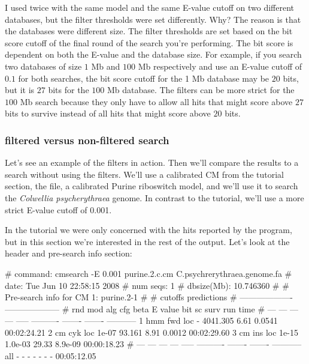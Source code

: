 \begin{srefaq}{I used  twice with the same model and
    the same E-value cutoff on two different databases, but the filter
    thresholds were set differently. Why?} The reason is that the
    databases were different size. The filter thresholds are set based
    on the bit score cutoff of the final round of the search you're
    performing. The bit score is dependent on both the E-value and the
    database size. For example, if you search two databases of size $1$
    Mb and $100$ Mb respectively and use an E-value cutoff of $0.1$ for both
    searches, the bit score cutoff for the 1 Mb database may be $20$
    bits, but it is $27$ bits for the $100$ Mb database. The filters
    can be more strict for the $100$ Mb search because they only have
    to allow all hits that might score above $27$ bits to
    survive instead of all hits that might score above $20$ bits. 
\end{srefaq}

\subsubsection{filtered versus non-filtered search}

Let's see an example of the filters in action. Then we'll compare the
results to a search without using the filters. We'll use a calibrated
CM from the tutorial section, the  file, a
calibrated Purine riboswitch model, and we'll use it to search the
\emph{Colwellia psycherythraea} genome. In contrast to the tutorial,
we'll use a more strict E-value cutoff of 0.001.


In the tutorial we were only concerned with the hits reported by the
program, but in this section we're interested in the rest of the
output. Let's look at the header and pre-search info section:

\begin{sreoutput}
# command:    cmsearch -E 0.001 purine.2.c.cm C.psychrerythraea.genome.fa
# date:       Tue Jun 10 22:58:15 2008
# num seqs:   1
# dbsize(Mb): 10.746360
#
# Pre-search info for CM 1: purine.2-1
#
#                                  cutoffs            predictions     
#                            -------------------  --------------------
# rnd  mod  alg  cfg   beta     E value   bit sc     surv     run time
# ---  ---  ---  ---  -----  ----------  -------  -------  -----------
    1  hmm  fwd  loc      -    4041.305     6.61   0.0541  00:02:24.21
    2   cm  cyk  loc  1e-07      93.161     8.91   0.0012  00:02:29.60
    3   cm  ins  loc  1e-15     1.0e-03    29.33  8.9e-09  00:00:18.23
# ---  ---  ---  ---  -----  ----------  -------  -------  -----------
  all    -    -    -      -           -        -        -  00:05:12.05
\end{sreoutput}

